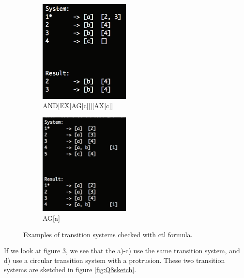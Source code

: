 \begin{figure}[H]
    \newline
    \begin{subfigure}{0.49\textwidth}
        \centering
        \includegraphics[width=0.5\textwidth]{fig/Q8example3}
        \caption{AND[EX[AG[c]]][AX[c]]}
        \label{fig:Q8ex3}
    \end{subfigure}
    \begin{subfigure}{0.49\textwidth}
        \centering
        \includegraphics[width=0.5\textwidth]{fig/Q8example4}
        \caption{AG[a]}
        \label{fig:Q8ex4}
    \end{subfigure}
    \caption{Examples of transition systems checked with ctl formula.}
    \label{fig:Q8ex}
\end{figure}

If we look at figure \ref{fig:Q8ex}, we see that the a)-c) use the same transition system, and d) use a circular transition system with a protrusion. These two transition systems are sketched in figure \ref{fig:Q8sketch}.

